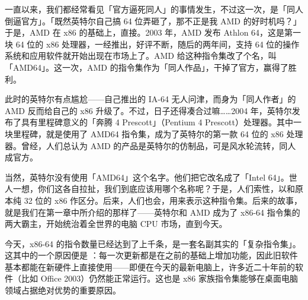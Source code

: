 一直以来，我们都经常看见「官方逼死同人」的事情发生，不过这一次，是「同人倒逼官方」。「既然英特尔自己搞 64 位弄砸了，那不正是我 AMD 的好时机吗？」于是，AMD 在 x86 的基础上，直接。2003 年，AMD 发布 Athlon 64，这是第一块 64 位的 x86 处理器，一经推出，好评不断，随后的两年间，支持 64 位的操作系统和应用软件就开始出现在市场上了。AMD 给这种指令集改了个名，叫「AMD64」。这一次，AMD 的指令集作为「同人作品」，干掉了官方，赢得了胜利。

此时的英特尔有点尴尬——自己推出的 IA-64 无人问津，而身为「同人作者」的 AMD 反而给自己的 x86 升级了。不过，日子还得凑合过嘛……2004 年，英特尔发布了具有里程碑意义的「奔腾 4 Prescott」（Pentium 4 Prescott）处理器。其中一块里程碑，就是使用了 AMD64 指令集，成为了英特尔的第一款 64 位的 x86 处理器。曾经，人们总认为 AMD 的产品是英特尔的仿制品，可是风水轮流转，同人成官方。

当然，英特尔没有使用「AMD64」这个名字。他们把它改名成了「Intel 64」。世人一想，你们这各自拉扯，我们到底应该用哪个名称呢？于是，人们索性，以和原本纯 32 位的 x86 作区分。后来，人们也会，用来表示这种指令集。后来的故事，就是我们在第一章中所介绍的那样了——英特尔和 AMD 成为了 x86-64 指令集的两大霸主，开始统治着全世界的电脑 CPU 市场，直到今天。

今天，x86-64 的指令数量已经达到了上千条，是一套名副其实的「复杂指令集」。这其中的一个原因便是 ：每一次更新都是在之前的基础上增加功能，因此旧软件基本都能在新硬件上直接使用——即便在今天的最新电脑上，许多近二十年前的软件（比如 Office 2003）仍然能正常运行。这也是 x86 家族指令集能够在桌面电脑领域占据绝对优势的重要原因。

